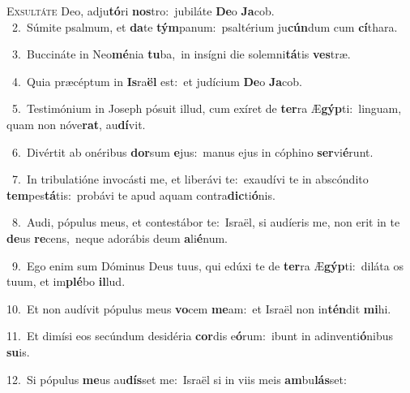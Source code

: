 \lettrine{\initial\textcolor{\initialcolor}{E}}{xsultáte} Deo, adju\-\textbf{tó}\-ri \textbf{nos}\-tro:~\star jubiláte \textbf{De}\-o \textbf{Ja}\-cob.\\
{\numbfont\textcolor{\numbcolor}{~2.}}~Súmite psalmum, et \textbf{da}\-te \textbf{tým}\-panum:~\star psaltérium ju\-\textbf{cún}\-dum cum \textbf{cí}\-thara.\par
{\numbfont\textcolor{\numbcolor}{~3.}}~Buccináte in Neo\-\textbf{mé}\-nia \textbf{tu}\-ba,~\star in insígni die solemni\-\textbf{tá}\-tis \textbf{ves}\-træ.\par
{\numbfont\textcolor{\numbcolor}{~4.}}~Quia præcéptum in \textbf{Is}\-ra\textbf{ël} est:~\star et judícium \textbf{De}\-o \textbf{Ja}\-cob.\par
{\numbfont\textcolor{\numbcolor}{~5.}}~Testimónium in Joseph pósuit illud, cum exíret de \textbf{ter}\-ra Æ\-\textbf{gýp}\-ti:~\star linguam, quam non nóve\-\textbf{rat}\-, au\-\textbf{dí}\-vit.\par
{\numbfont\textcolor{\numbcolor}{~6.}}~Divértit ab onéribus \textbf{dor}\-sum \textbf{e}\-jus:~\star manus ejus in cóphino \textbf{ser}\-vi\-\textbf{é}\-runt.\par
{\numbfont\textcolor{\numbcolor}{~7.}}~In tribulatióne invocásti me, et liberávi te:~\dagger exaudívi te in abscóndito \textbf{tem}\-pes\-\textbf{tá}\-tis:~\star probávi te apud aquam contra\-\textbf{dic}\-ti\-\textbf{ó}\-nis.\par
{\numbfont\textcolor{\numbcolor}{~8.}}~Audi, pópulus meus, et contestábor te:~\dagger Israël, si audíeris me, non erit in te \textbf{de}\-us \textbf{re}\-cens,~\star neque adorábis deum \textbf{a}\-li\-\textbf{é}\-num.\par
{\numbfont\textcolor{\numbcolor}{~9.}}~Ego enim sum Dóminus Deus tuus, qui edúxi te de \textbf{ter}\-ra Æ\-\textbf{gýp}\-ti:~\star diláta os tuum, et im\-\textbf{plé}\-bo \textbf{il}\-lud.\par
{\numbfont\textcolor{\numbcolor}{10.}}~Et non audívit pópulus meus \textbf{vo}\-cem \textbf{me}\-am:~\star et Israël non in\-\textbf{tén}\-dit \textbf{mi}\-hi.\par
{\numbfont\textcolor{\numbcolor}{11.}}~Et dimísi eos secúndum desidéria \textbf{cor}\-dis e\-\textbf{ó}\-rum:~\star ibunt in adinventi\-\textbf{ó}\-nibus \textbf{su}\-is.\par
{\numbfont\textcolor{\numbcolor}{12.}}~Si pópulus \textbf{me}\-us au\-\textbf{dís}\-set me:~\star Israël si in viis meis \textbf{am}\-bu\-\textbf{lás}\-set:\par
